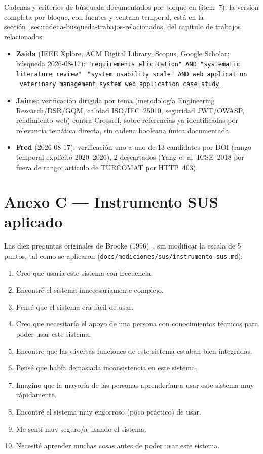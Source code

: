 Cadenas y criterios de b\'usqueda documentados por bloque en
 (\'item~7); la versi\'on completa
por bloque, con fuentes y ventana temporal, est\'a en la
secci\'on~\ref{sec:cadena-busqueda-trabajos-relacionados} del
cap\'itulo de trabajos relacionados:

\begin{itemize}[nosep]
  \item \textbf{Zaida} (IEEE Xplore, ACM Digital Library, Scopus, Google
    Scholar; b\'usqueda 2026-08-17):
    \texttt{"requirements elicitation" AND\allowbreak\ "systematic
    literature review"}
    \textbullet\ \texttt{"system usability scale" AND\allowbreak\ web
    application}
    \textbullet\ \texttt{veterinary management system web application case
    study}.
  \item \textbf{Jaime}: verificaci\'on dirigida por tema (metodolog\'ia
    Engineering Research/DSR/GQM, calidad ISO/IEC~25010, seguridad
    JWT/OWASP, rendimiento web) contra Crossref, sobre referencias ya
    identificadas por relevancia tem\'atica directa, sin cadena booleana
    \'unica documentada.
  \item \textbf{Fred} (2026-08-17): verificaci\'on uno a uno de 13
    candidatos por DOI (rango temporal expl\'icito 2020--2026), 2
    descartados (Yang et al. ICSE~2018 por fuera de rango; art\'iculo de
    TURCOMAT por HTTP~403).
\end{itemize}

\section{Anexo C --- Instrumento SUS aplicado}
\label{sec:anexo-sus}

Las diez preguntas originales de Brooke (1996)~\cite{sus-brooke1996}, sin
modificar la escala de 5 puntos, tal como se aplicaron
(\texttt{docs/mediciones/sus/instrumento-sus.md}):

\begin{enumerate}[nosep]
  \item Creo que usar\'ia este sistema con frecuencia.
  \item Encontr\'e el sistema innecesariamente complejo.
  \item Pens\'e que el sistema era f\'acil de usar.
  \item Creo que necesitar\'ia el apoyo de una persona con conocimientos
    t\'ecnicos para poder usar este sistema.
  \item Encontr\'e que las diversas funciones de este sistema estaban bien
    integradas.
  \item Pens\'e que hab\'ia demasiada inconsistencia en este sistema.
  \item Imagino que la mayor\'ia de las personas aprender\'ian a usar este
    sistema muy r\'apidamente.
  \item Encontr\'e el sistema muy engorroso (poco pr\'actico) de usar.
  \item Me sent\'i muy seguro/a usando el sistema.
  \item Necesit\'e aprender muchas cosas antes de poder usar este sistema.
\end{enumerate}

